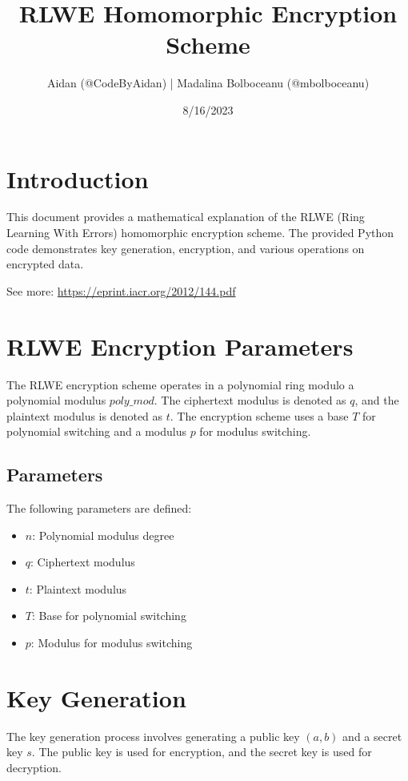 \documentclass{article}
\begin{document}
\title{RLWE Homomorphic Encryption Scheme}
\author{Aidan (@CodeByAidan) | Madalina Bolboceanu (@mbolboceanu)}
\date{8/16/2023}
\maketitle

\section{Introduction}

This document provides a mathematical explanation of the RLWE (Ring Learning With Errors) homomorphic encryption scheme. The provided Python code demonstrates key generation, encryption, and various operations on encrypted data.

See more: \url{https://eprint.iacr.org/2012/144.pdf}

\section{RLWE Encryption Parameters}

The RLWE encryption scheme operates in a polynomial ring modulo a polynomial modulus $poly\_mod$. The ciphertext modulus is denoted as $q$, and the plaintext modulus is denoted as $t$. The encryption scheme uses a base $T$ for polynomial switching and a modulus $p$ for modulus switching.

\subsection{Parameters}

The following parameters are defined:

\begin{itemize}
    \item $n$: Polynomial modulus degree
    \item $q$: Ciphertext modulus
    \item $t$: Plaintext modulus
    \item $T$: Base for polynomial switching
    \item $p$: Modulus for modulus switching
\end{itemize}

\section{Key Generation}

The key generation process involves generating a public key $(a, b)$ and a secret key $s$. The public key is used for encryption, and the secret key is used for decryption.
\end{document}

